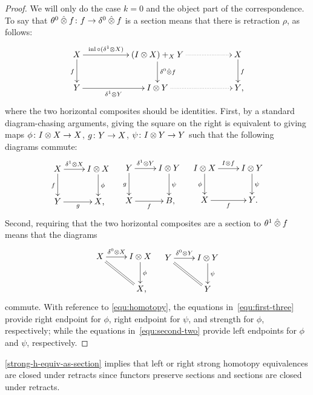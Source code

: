 \documentclass[reqno,10pt,a4paper,oneside,draft]{amsart}
\begin{document}
\begin{proof}
We will only do the case $k = 0$ and the object part of the correspondence.
To say that $\theta^0 \mathbin{\hat{\otimes}} f \colon f \to \delta^0 \mathbin{\hat{\otimes}} f$ is a section means that there is retraction $\rho$, as follows:
\[
\xymatrix@C+3em{
  X
  \ar[r]^-{\inl \cc (\rcyl \otimes X)}
  \ar[d]_f
&
  (\interval \otimes X) +_{X} Y
  \ar[d]^{\lcyl \hatotimes f}
  \ar@{.>}[r]
&
  X
  \ar[d]^f
\\
  Y
  \ar[r]_-{\rcyl \otimes Y}
&
  \interval \otimes Y
  \ar@{.>}[r]
&
  Y
\rlap{,}}
\]
where the two horizontal composites should be identities.
First, by a standard diagram-chasing arguments, giving the square on the right is equivalent to giving maps $\phi \colon I \otimes X \to X$, $g \colon Y \to X$, $\psi \colon I \otimes Y \to Y$ such that the following diagrams commute:
\begin{align} \label{equ:first-three}
\xycenter{
  X
  \ar[r]^-{\rcyl \otimes X}
  \ar[d]_f
&
  \interval \otimes X \ar[d]^{\phi}
\\
  Y \ar[r]_{g}
&
  X
\rlap{,}}
&&
\xycenter{
  Y
  \ar[r]^-{\rcyl \otimes Y}
  \ar[d]_g
&
  \interval \otimes Y \ar[d]^{\psi}
\\
  X
  \ar[r]_f
&
  B
\rlap{,}}
&&
\xycenter{
  \interval \otimes X
  \ar[d]_\phi
  \ar[r]^{I \otimes f}
&
  \interval \otimes Y
  \ar[d]^\psi
\\
  X
  \ar[r]_{f}
&
  Y
\rlap{.}}
\end{align}
Second, requiring that the two horizontal composites are a section to $\theta^1 \mathbin{\hat{\otimes}} f$ means that the diagrams
\begin{align} \label{equ:second-two}
\xycenter{
  X
  \ar[r]^-{\lcyl \otimes X}
  \ar@{=}[dr]
&
  \interval \otimes X \ar[d]^\phi
\\&
  X
\rlap{,}}
&&
\xycenter{
  Y
  \ar[r]^-{\lcyl \otimes Y}
  \ar@{=}[dr]
&
  \interval \otimes Y \ar[d]^{\psi}
\\&
  Y
}
\end{align}
commute.
With reference to \eqref{equ:homotopy}, the equations in~\eqref{equ:first-three} provide right endpoint for $\phi$, right endpoint for $\psi$, and strength for $\phi$, respectively; while the equations in~\eqref{equ:second-two} provide left endpoints for $\phi$ and $\psi$, respectively.
\end{proof}

\begin{remark}
\cref{strong-h-equiv-as-section} implies that left or right strong homotopy equivalences are closed under retracts since functors preserve sections and sections are closed under retracts.
\end{remark}
\end{document}
